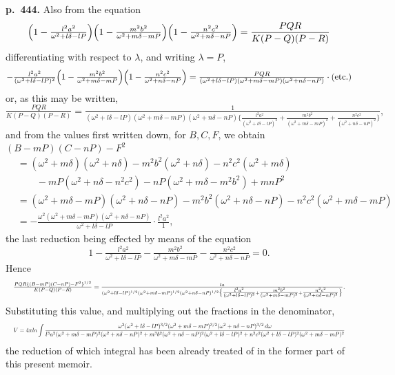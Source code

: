 \documentclass[11pt]{article}
\begin{document}
\bigskip
\noindent\textbf{p.~444.} Also from the equation
\[ \Bigl(1 - \tfrac{l^2 a^2}{\omega^2 + l\delta - l P}\Bigr)\Bigl(1 - \tfrac{m^2 b^2}{\omega^2 + m\delta - m P}\Bigr)\Bigl(1 - \tfrac{n^2 c^2}{\omega^2 + n\delta - n P}\Bigr) = \frac{PQR}{K(P - Q)(P - R)} \]
differentiating with respect to $\lambda$, and writing $\lambda = P$,
\[ -\tfrac{l^2 a^2}{(\omega^2 + l\delta - lP)^2}\Bigl(1 - \tfrac{m^2 b^2}{\omega^2 + m\delta - mP}\Bigr)\Bigl(1 - \tfrac{n^2 c^2}{\omega^2 + n\delta - nP}\Bigr) = \tfrac{PQR}{(\omega^2 + l\delta - lP)(\omega^2 + m\delta - mP)(\omega^2 + n\delta - nP)} \cdot \text{(etc.)} \]
or, as this may be written,
\[ \tfrac{PQR}{K(P - Q)(P - R)} = \tfrac{1}{(\omega^2 + l\delta - lP)(\omega^2 + m\delta - mP)(\omega^2 + n\delta - nP)\bigl\{\tfrac{l^2 a^2}{(\omega^2 + l\delta - lP)^2} + \tfrac{m^2 b^2}{(\omega^2 + m\delta - mP)^2} + \tfrac{n^2 c^2}{(\omega^2 + n\delta - nP)^2}\bigr\}}, \]
and from the values first written down, for $B, C, F$, we obtain $(B - mP)(C - nP) - F^2$
\[
\begin{aligned}
&= (\omega^2 + m\delta)(\omega^2 + n\delta) - m^2 b^2(\omega^2 + n\delta) - n^2 c^2(\omega^2 + m\delta)\\
&\qquad - mP(\omega^2 + n\delta - n^2 c^2) - nP(\omega^2 + m\delta - m^2 b^2) + mnP^2\\
&= (\omega^2 + m\delta - mP)(\omega^2 + n\delta - nP) - m^2 b^2(\omega^2 + n\delta - nP) - n^2 c^2(\omega^2 + m\delta - mP)\\
&= -\frac{\omega^2(\omega^2 + m\delta - mP)(\omega^2 + n\delta - nP)}{\omega^2 + l\delta - lP}\cdot\frac{l^2 a^2}{1},
\end{aligned}
\]
the last reduction being effected by means of the equation
\[ 1 - \tfrac{l^2 a^2}{\omega^2 + l\delta - lP} - \tfrac{m^2 b^2}{\omega^2 + m\delta - mP} - \tfrac{n^2 c^2}{\omega^2 + n\delta - nP} = 0. \]
Hence
\[ \resizebox{\textwidth}{!}{$\displaystyle \tfrac{PQR\{(B - mP)(C - nP) - F^2\}^{1/2}}{K(P - Q)(P - R)} = \tfrac{la}{(\omega^2 + l\delta - lP)^{1/2}(\omega^2 + m\delta - mP)^{1/2}(\omega^2 + n\delta - nP)^{1/2}\bigl\{\tfrac{l^2 a^2}{(\omega^2 + l\delta - lP)^2} + \tfrac{m^2 b^2}{(\omega^2 + m\delta - mP)^2} + \tfrac{n^2 c^2}{(\omega^2 + n\delta - nP)^2}\bigr\}}.$} \]
Substituting this value, and multiplying out the fractions in the denominator,
\[ \resizebox{\textwidth}{!}{$\displaystyle V = 4\pi la \int \frac{\omega^2(\omega^2 + l\delta - lP)^{3/2}(\omega^2 + m\delta - mP)^{3/2}(\omega^2 + n\delta - nP)^{3/2}\,d\omega}{l^3 a^2(\omega^2 + m\delta - mP)^2(\omega^2 + n\delta - nP)^2 + m^3 b^2(\omega^2 + n\delta - nP)^2(\omega^2 + l\delta - lP)^2 + n^3 c^2(\omega^2 + l\delta - lP)^2(\omega^2 + m\delta - mP)^2}$} \]
the reduction of which integral has been already treated of in the former part of this present memoir.
\end{document}
